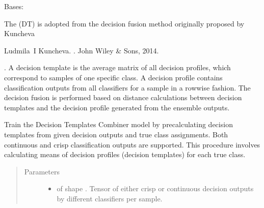\documentclass[letterpaper,10pt,english]{sphinxmanual}
\begin{document}
\begin{fulllineitems}
\label{\detokenize{pusion.core.decision_templates_combiner:pusion.core.decision_templates_combiner.DecisionTemplatesCombiner}}
\sphinxAtStartPar
Bases: {\hyperref[\detokenize{pusion.core.combiner:pusion.core.combiner.TrainableCombiner}]{}}

\sphinxAtStartPar
The {\hyperref[\detokenize{pusion.core.decision_templates_combiner:pusion.core.decision_templates_combiner.DecisionTemplatesCombiner}]{}} (DT) is adopted from the decision fusion method originally proposed by
Kuncheva %
\begin{footnote}[1]\sphinxAtStartFootnote
Ludmila I Kuncheva. . John Wiley \& Sons, 2014.
%
\end{footnote}. A decision template is the average matrix of all decision profiles,
which correspond to samples of one specific class. A decision profile contains classification outputs from all
classifiers for a sample in a row\sphinxhyphen{}wise fashion. The decision fusion is performed based on distance calculations
between decision templates and the decision profile generated from the ensemble outputs.

\sphinxAtStartPar


\begin{fulllineitems}
\label{\detokenize{pusion.core.decision_templates_combiner:pusion.core.decision_templates_combiner.DecisionTemplatesCombiner.train}}
\sphinxAtStartPar
Train the Decision Templates Combiner model by precalculating decision templates from given decision outputs and
true class assignments. Both continuous and crisp classification outputs are supported. This procedure involves
calculating means of decision profiles (decision templates) for each true class.
\begin{quote}\begin{description}
\item[{Parameters}] \leavevmode\begin{itemize}
\item {} 
\sphinxAtStartPar
{} \textendash{}  of shape .
Tensor of either crisp or continuous decision outputs by different classifiers per sample.


\end{itemize}
\end{description}
\end{quote}
\end{fulllineitems}
\end{fulllineitems}
\end{document}
